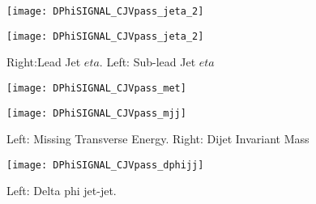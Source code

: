\documentclass[a4paper,10pt]{article}
\begin{document}
\begin{figure}[!h]
\centering
\begin{minipage}[!h]{0.4\linewidth}
\centering
\texttt{[image: DPhiSIGNAL\_CJVpass\_jeta\_2]}
\end{minipage}%
\begin{minipage}[!h]{0.4\linewidth}
\centering
\texttt{[image: DPhiSIGNAL\_CJVpass\_jeta\_2]}
\end{minipage}
\caption{Right:Lead Jet $eta$. Left: Sub-lead Jet $eta$}
\end{figure}

\begin{figure}[!h]
\centering
\begin{minipage}[!h]{0.4\linewidth}
\centering
\texttt{[image: DPhiSIGNAL\_CJVpass\_met]}
\end{minipage}%
\begin{minipage}[!h]{0.4\linewidth}
\centering
\texttt{[image: DPhiSIGNAL\_CJVpass\_mjj]}
\end{minipage}
\caption{Left: Missing Transverse Energy. Right: Dijet Invariant Mass}
\end{figure}

\begin{figure}[!h]
\centering
\begin{minipage}[!h]{0.4\linewidth}
\centering
\texttt{[image: DPhiSIGNAL\_CJVpass\_dphijj]}
\end{minipage}%
\begin{minipage}[!h]{0.4\linewidth}
\centering
\end{minipage}
\caption{Left: Delta phi jet-jet.}
\end{figure}
\end{document}
